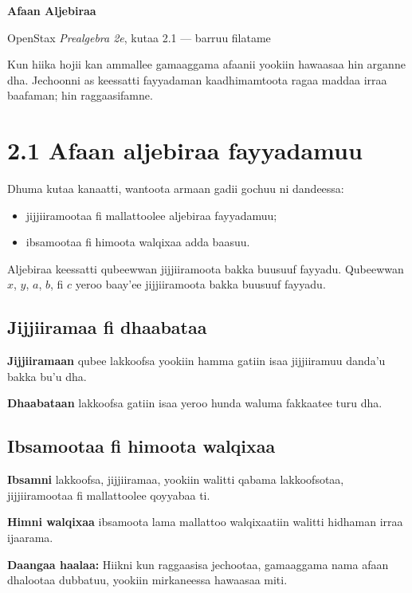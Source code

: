 \documentclass[11pt]{article}
\begin{document}
\begin{center}
  {\Large\bfseries Afaan Aljebiraa}\par
  \vspace{0.35em}
  {\small OpenStax \textit{Prealgebra 2e}, kutaa 2.1 --- barruu filatame}
\end{center}

\vspace{0.6em}
\colorbox{statusgreen}{\parbox{0.94\textwidth}{\small
Kun hiika hojii kan ammallee gamaaggama afaanii yookiin hawaasaa hin arganne dha.
Jechoonni as keessatti fayyadaman kaadhimamtoota ragaa maddaa irraa baafaman;
hin raggaasifamne.}}

\section*{2.1 Afaan aljebiraa fayyadamuu}

Dhuma kutaa kanaatti, wantoota armaan gadii gochuu ni dandeessa:

\begin{itemize}
  \item jijjiiramootaa fi mallattoolee aljebiraa fayyadamuu;
  \item ibsamootaa fi himoota walqixaa adda baasuu.
\end{itemize}

Aljebiraa keessatti qubeewwan jijjiiramoota bakka buusuuf fayyadu. Qubeewwan
$x$, $y$, $a$, $b$, fi $c$ yeroo baay'ee jijjiiramoota bakka buusuuf fayyadu.

\subsection*{Jijjiiramaa fi dhaabataa}

\textbf{Jijjiiramaan} qubee lakkoofsa yookiin hamma gatiin isaa jijjiiramuu
danda'u bakka bu'u dha.

\textbf{Dhaabataan} lakkoofsa gatiin isaa yeroo hunda waluma fakkaatee turu dha.

\subsection*{Ibsamootaa fi himoota walqixaa}

\textbf{Ibsamni} lakkoofsa, jijjiiramaa, yookiin walitti qabama lakkoofsotaa,
jijjiiramootaa fi mallattoolee qoyyabaa ti.

\textbf{Himni walqixaa} ibsamoota lama mallattoo walqixaatiin walitti hidhaman
irraa ijaarama.

\vfill
{\footnotesize\textbf{Daangaa haalaa:} Hiikni kun raggaasisa jechootaa,
gamaaggama nama afaan dhalootaa dubbatuu, yookiin mirkaneessa hawaasaa miti.}
\end{document}

